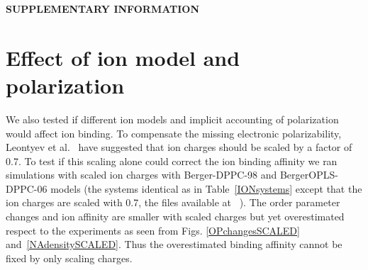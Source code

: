 \documentclass[pre,aps,floatfix,authordate1-4,twocolumn]{revtex4-1}
\begin{document}
\newpage

\appendix
\begin{center}
{\bf SUPPLEMENTARY INFORMATION}
\end{center}

\section{Effect of ion model and polarization}

 We also tested if different ion models and implicit accounting of polarization would affect ion binding.
To compensate the missing electronic polarizability, Leontyev et al.~\cite{leontyev11} have suggested
that ion charges should be scaled by a factor of 0.7. To test if this scaling alone could correct the ion
binding affinity we ran simulations with scaled ion charges with Berger-DPPC-98 and BergerOPLS-DPPC-06 models 
(the systems identical as in Table~\ref{IONsystems} except that the ion charges are scaled with 0.7, the files available 
at ~\cite{DPPCBergerNaCl150mMscaled,DPPCBergerNaCl1000mMscaled,DPPCBergerOPLS06NaCl150mMscaled,DPPCBergerOPLS06NaCl1000mMscaled}). 
The order parameter changes and ion affinity are smaller with scaled charges but yet overestimated respect to
the experiments as seen from Figs. \ref{OPchangesSCALED} and~\ref{NAdensitySCALED}. Thus the overestimated
binding affinity cannot be fixed by only scaling charges.


\end{document}
